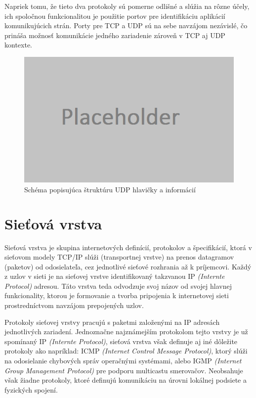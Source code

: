 \documentclass[
  digital, %
  table,   %
  lof,     %
  nolot,   %
  nocover
]{fithesis3}
\begin{document}
Napriek tomu, že tieto dva protokoly sú pomerne odlišné a slúžia na rôzne
účely, ich spoločnou funkcionalitou je použitie portov pre identifikáciu
aplikácií komunikujúcich strán. Porty pre TCP a UDP sú na sebe navzájom
nezávislé, čo prináša možnosť komunikácie jedného zariadenie zároveň v TCP aj
UDP kontexte.

\begin{figure}[H]
  \centering
    \includegraphics[width=.80\textwidth]{images/net-udp-head.png}
  \caption{Schéma popisujúca štruktúru UDP hlavičky a informácií}
  \label{fig:net-udp-head}
\end{figure}

\section{Sieťová vrstva}
Sieťová vrstva je skupina internetových definícií, protokolov a špecifikácií, ktorá
v sieťovom modely TCP/IP slúži (transportnej vrstve) na prenos datagramov
(paketov) od odosielateľa, cez jednotlivé sieťové rozhrania až k príjemcovi.
Každý z uzlov v sieti je na sieťovej vrstve identifikovaný takzvanou IP
\textit{(Internte Protocol)} adresou. Táto vrstva teda odvodzuje svoj názov od
svojej hlavnej funkcionality, ktorou je formovanie a tvorba pripojenia k
internetovej sieti prostredníctvom navzájom prepojených uzlov.

Protokoly sieťovej vrstvy pracujú s paketmi založenými na IP adresách
jednotlivých zariadení. Jednoznačne najznámejším protokolom tejto vrstvy je už
spomínaný IP \textit{(Internte Protocol)}, sieťová vrstva však definuje aj iné
dôležite protokoly ako napríklad: ICMP
\textit{(Internet Control Message Protocol)}, ktorý slúži na odosielanie
chybových správ operačnými systémami, alebo IGMP
\textit{(Internet Group Management Protocol)} pre podporu multicastu smerovačov.
Neobsahuje však žiadne protokoly, ktoré definujú komunikáciu na
úrovni lokálnej podsiete a fyzických spojení.
\end{document}
